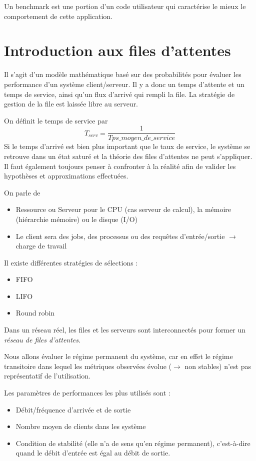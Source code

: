 \documentclass{article}
\begin{document}
Un benchmark est une portion d'un code utilisateur qui caractérise le mieux le comportement de cette application.

\section{Introduction aux files d'attentes}
Il s'agit d'un modèle mathématique basé sur des probabilités pour évaluer les performance d'un système client/serveur. Il y a donc un temps d'attente et un temps de service, ainsi qu'un flux d'arrivé qui rempli la file. La stratégie de gestion de la file est laissée libre au serveur.

On définit le temps de service par 
\[T_{serv} = \dfrac{1}{Tps\_moyen\_de\_service}\]
Si le temps d'arrivé est bien plus important que le taux de service, le système se retrouve dans un état saturé et la théorie des files d'attentes ne peut s'appliquer. Il faut également toujours penser à confronter à la réalité afin de valider les hypothèses et approximations effectuées.

On parle de
\begin{itemize}
\item Ressource ou Serveur pour le CPU (cas serveur de calcul), la mémoire (hiérarchie mémoire) ou le disque (I/O)
\item Le client sera des jobs, des processus ou des requêtes d'entrée/sortie $\to$ charge de travail
\end{itemize}

Il existe différentes stratégies de sélections : \begin{itemize}
\item FIFO
\item LIFO
\item Round robin
\end{itemize}


Dans un réseau réel, les files et les serveurs sont interconnectés pour former un \emph{réseau de files d'attentes}.




Nous allons évaluer le régime permanent du système, car en effet le régime transitoire dans lequel les métriques observées évolue ($\to$ non stables) n'est pas représentatif de l'utilisation.


Les paramètres de performances les plus utilisés sont :
\begin{itemize}
\item Débit/fréquence d'arrivée et de sortie
\item Nombre moyen de clients dans les système
\item Condition de stabilité (elle n'a de sens qu'en régime permanent), c'est-à-dire quand le débit d'entrée est égal au débit de sortie.
\end{itemize}
\end{document}
